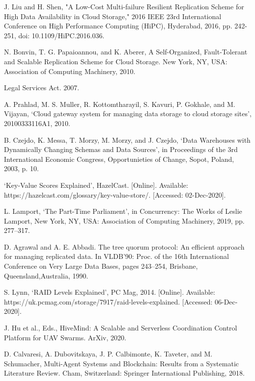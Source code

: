 \documentclass{UoYCSproject}
\begin{document}
\begin{thebibliography}{100}
J. Liu and H. Shen, "A Low-Cost Multi-failure Resilient Replication Scheme for High Data Availability in Cloud Storage," 2016 IEEE 23rd International Conference on High Performance Computing (HiPC), Hyderabad, 2016, pp. 242-251, doi: 10.1109/HiPC.2016.036.

N. Bonvin, T. G. Papaioannou, and K. Aberer, A Self-Organized, Fault-Tolerant and Scalable Replication Scheme for Cloud Storage. New York, NY, USA: Association of Computing Machinery, 2010.

Legal Services Act. 2007.

A. Prahlad, M. S. Muller, R. Kottomtharayil, S. Kavuri, P. Gokhale, and M. Vijayan, ‘Cloud gateway system for managing data storage to cloud storage sites’, 20100333116A1, 2010.

B. Czejdo, K. Messa, T. Morzy, M. Morzy, and J. Czejdo, ‘Data Warehouses with Dynamically Changing Schemas and Data Sources’, in Proceedings of the 3rd International Economic Congress, Opportunieties of Change, Sopot, Poland, 2003, p. 10.

‘Key-Value Scores Explained’, HazelCast. [Online]. Available: https://hazelcast.com/glossary/key-value-store/. [Accessed: 02-Dec-2020].

L. Lamport, ‘The Part-Time Parliament’, in Concurrency: The Works of Leslie Lamport, New York, NY, USA: Association of Computing Machinery, 2019, pp. 277–317.

D. Agrawal and A. E. Abbadi. The tree quorum protocol: An efficient approach for managing replicated data. In VLDB’90: Proc. of the 16th International Conference on Very Large Data Bases, pages 243–254, Brisbane, Queensland,Australia, 1990.

S. Lynn, ‘RAID Levels Explained’, PC Mag, 2014. [Online]. Available: https://uk.pcmag.com/storage/7917/raid-levels-explained. [Accessed: 06-Dec-2020].

J. Hu et al., Eds., HiveMind: A Scalable and Serverless Coordination Control Platform for UAV Swarms. ArXiv, 2020.

D. Calvaresi, A. Dubovitskaya, J. P. Calbimonte, K. Taveter, and M. Schumacher, Multi-Agent Systems and Blockchain: Results from a Systematic Literature Review. Cham, Switzerland: Springer International Publishing, 2018.


\end{thebibliography}
\end{document}
